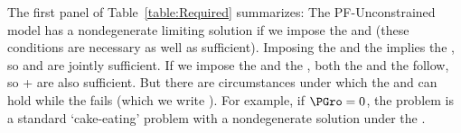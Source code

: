 \documentclass[BufferStockTheory]{subfiles}
\begin{document}
\begin{comment}
\begin{align}
  \vLevBF_{t}  & = \uFunc(\cRat_{t})+\DiscFac \uFunc(\cRat_{t}\Pat)+\DiscFac^{2} \uFunc(\cRat_{t} \Pat^{2})+... \label{eq:ValuePFAnalyticalAutarky}
  \\  & = \uFunc(\cRat_{t})\left(1+\DiscFac \Pat^{1-\CRRA}+(\DiscFac \Pat^{1-\CRRA})^{2}+...\right) \notag 
  \\  & = \uFunc(\cRat_{t})\left(\frac{1-(\DiscFac \Pat^{1-\CRRA})^{T-t+1}}{1-\DiscFac \Pat^{1-\CRRA}}\right) \notag
  \\  & = \left(\frac{\uFunc(1-\PatR)}{1-\DiscFac \Pat^{1-\CRRA}}\right) \notag
  \\  & \propto \left(\frac{(1-\PatR)^{1-\CRRA}}{1-\DiscFac \Pat^{1-\CRRA}}\right) \notag      \end{align}
\end{comment}



The first panel of Table~\ref{table:Required} summarizes:  The PF-Unconstrained model has a nondegenerate limiting solution if we impose the {\RIC} and {\FHWC} (these conditions are necessary as well as sufficient).  Imposing the {\PFFVAC} and the {\FHWC} implies the {\RIC}, so {\PFFVAC} and {\FHWC} are jointly sufficient.  If we impose the {\GIC} and the {\FHWC}, both the {\PFFVAC} and the {\RIC} follow, so {\GIC}+{\FHWC} are also sufficient.  But there are circumstances under which the {\RIC} and {\FHWC} can hold while the {\PFFVAC} fails (which we write \cncl{\PFFVAC}).  For example, if $\PGro=0$, the problem is a standard `cake-eating' problem with a nondegenerate solution under the {\RIC}.%
\end{document}

